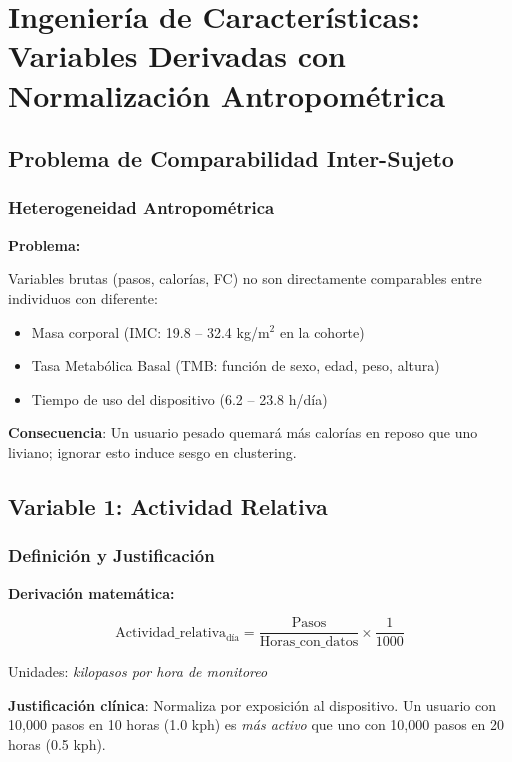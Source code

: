 \documentclass[12pt,letterpaper,twoside]{report}
\begin{document}
\chapter{Ingeniería de Características: Variables Derivadas con Normalización Antropométrica}

\section{Problema de Comparabilidad Inter-Sujeto}

\subsection{Heterogeneidad Antropométrica}

\begin{hipotesisbox}
\textbf{Problema:}

Variables brutas (pasos, calorías, FC) no son directamente comparables entre individuos con diferente:
\begin{itemize}[noitemsep]
    \item Masa corporal (IMC: 19.8 -- 32.4 kg/m$^2$ en la cohorte)
    \item Tasa Metabólica Basal (TMB: función de sexo, edad, peso, altura)
    \item Tiempo de uso del dispositivo (6.2 -- 23.8 h/día)
\end{itemize}

\textbf{Consecuencia}: Un usuario pesado quemará más calorías en reposo que uno liviano; ignorar esto induce sesgo en clustering.
\end{hipotesisbox}

\section{Variable 1: Actividad Relativa}

\subsection{Definición y Justificación}

\begin{estadisticobox}
\textbf{Derivación matemática:}

\begin{equation}
\text{Actividad\_relativa}_{\text{día}} = \frac{\text{Pasos}}{\text{Horas\_con\_datos}} \times \frac{1}{1000}
\end{equation}

Unidades: \textit{kilopasos por hora de monitoreo}

\textbf{Justificación clínica}: Normaliza por exposición al dispositivo. Un usuario con 10,000 pasos en 10 horas (1.0 kph) es \textit{más activo} que uno con 10,000 pasos en 20 horas (0.5 kph).
\end{estadisticobox}
\end{document}
